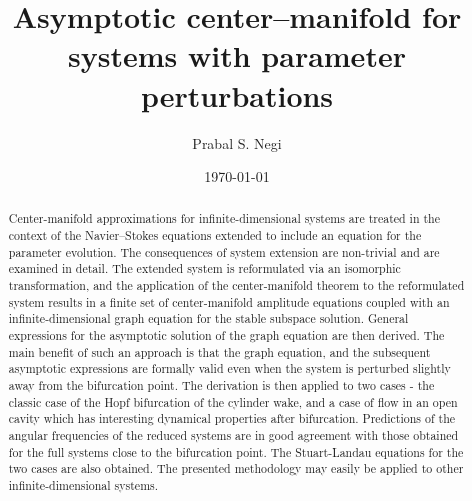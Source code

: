 \documentclass[aps,prr,twocolumn,groupedaddress]{revtex4-2}
\begin{document}
	
\title{Asymptotic center--manifold for systems with parameter perturbations}
\author{Prabal S. Negi}

\date{\today}

\begin{abstract}
Center-manifold approximations for infinite-dimensional systems are treated in the context of the Navier--Stokes equations extended to include an equation for the parameter evolution. The consequences of system extension are non-trivial and are examined in detail. The extended system is reformulated via an isomorphic transformation, and the application of the center-manifold theorem to the reformulated system results in a finite set of center-manifold amplitude equations coupled with an infinite-dimensional graph equation for the stable subspace solution. General expressions for the asymptotic solution of the graph equation are then derived. The main benefit of such an approach is that the graph equation, and the subsequent asymptotic expressions are formally valid even when the system is perturbed slightly away from the bifurcation point. The derivation is then applied to two cases - the classic case of the Hopf bifurcation of the cylinder wake, and a case of flow in an open cavity which has interesting dynamical properties after bifurcation. Predictions of the angular frequencies of the reduced systems are in good agreement with those obtained for the full systems close to the bifurcation point. The Stuart-Landau equations for the two cases are also obtained. The presented methodology may easily be applied to other infinite-dimensional systems. 
\end{abstract}

\maketitle

%


%


\FloatBarrier



\end{document}
